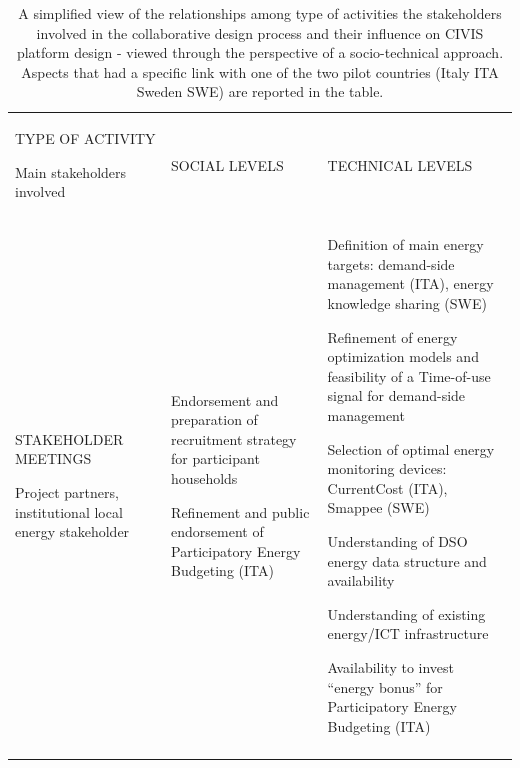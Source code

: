 \begin{table}
\vspace*{11.5cm} 
\label{tab:activities}  
\caption{A simplified view of the relationships among type of activities the stakeholders involved in the collaborative design process and their influence on CIVIS platform design - viewed through the perspective of a socio-technical approach. Aspects that had a specific link with one of the two pilot countries (Italy ITA Sweden SWE) are reported in the table.}
\renewcommand{\arraystretch}{0.8}
\begin{tabular}{>{\centering\arraybackslash}m{5.3cm}>{\centering\arraybackslash}m{6.5cm}>{\centering\arraybackslash}m{7cm}}
\hline\noalign{\smallskip}
TYPE OF ACTIVITY\par Main stakeholders involved   & SOCIAL LEVELS & TECHNICAL LEVELS  \\
\svhline\noalign{\smallskip}
STAKEHOLDER MEETINGS \par
Project partners, institutional local energy stakeholder
&   \begin{compactitem}
	\item Endorsement and preparation of recruitment strategy for participant households
	\item Refinement and public endorsement of Participatory Energy Budgeting (ITA)
\end{compactitem} \vspace*{-.3cm} \vspace*{-.2cm}
&  \begin{compactitem}
	\item Definition of main energy targets: demand-side management (ITA), energy knowledge sharing (SWE)
	\item	Refinement of energy optimization models and feasibility of a Time-of-use signal for demand-side management
	\item 	Selection of optimal energy monitoring devices: CurrentCost (ITA), Smappee (SWE)
	\item 	Understanding of DSO energy data structure and availability
	\item 	Understanding of existing energy/ICT infrastructure
	\item 	Availability to invest ``energy bonus'' for Participatory Energy Budgeting  (ITA)
\end{compactitem} \vspace*{-.3cm} \vspace*{-.2cm} \\
  \hline\noalign{\smallskip}

\end{tabular}
\end{table}
